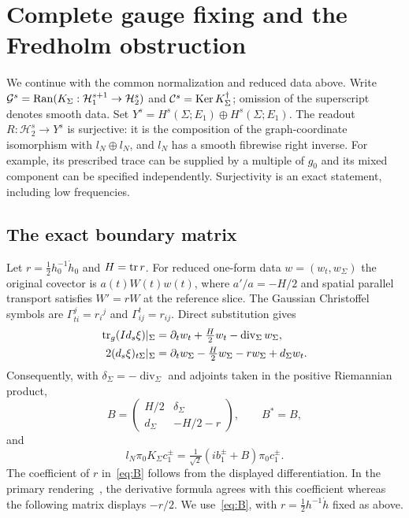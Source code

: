 \section{Complete gauge fixing and the Fredholm obstruction}\label{sec:fredholm}
We continue with the common normalization and reduced data above.
Write $\mathcal G^s=\operatorname{Ran}(K_\Sigma:\mathcal H_1^{s+1}\to\mathcal H_2^s)$ and $\mathcal C^s=\operatorname{Ker} K_\Sigma^\dagger$; omission of the superscript denotes smooth data.
Set $Y^s=H^s(\Sigma;E_1)\oplus H^s(\Sigma;E_1)$.
The readout $R:\mathcal H_2^s\to Y^s$ is surjective: it is the composition of the graph-coordinate isomorphism with $l_N\oplus l_N$, and $l_N$ has a smooth fibrewise right inverse.
For example, its prescribed trace can be supplied by a multiple of $g_0$ and its mixed component can be specified independently.
Surjectivity is an exact statement, including low frequencies.

\subsection{The exact boundary matrix}
Let $r=\tfrac12h_0^{-1}\dot h_0$ and $H=\operatorname{tr} r$.
For reduced one-form data $w=(w_t,w_\Sigma)$ the original covector is $a(t)W(t)w(t)$, where $a'/a=-H/2$ and spatial parallel transport satisfies $W'=rW$ at the reference slice.
The Gaussian Christoffel symbols are $\Gamma^j_{ti}=r_i{}^j$ and $\Gamma^t_{ij}=r_{ij}$.
Direct substitution gives
\begin{align*}
\operatorname{tr}_g(I d_s\xi)|_\Sigma
 &=\partial_t w_t+\tfrac H2w_t-\operatorname{div}_\Sigma w_\Sigma,\\
2(d_s\xi)_{t\Sigma}|_\Sigma
 &=\partial_t w_\Sigma-\tfrac H2w_\Sigma-rw_\Sigma+d_\Sigma w_t.
\end{align*}
Consequently, with $\delta_\Sigma=-\operatorname{div}_\Sigma$ and adjoints taken in the positive Riemannian product,
\begin{equation}\label{eq:B}
B=\begin{pmatrix}H/2&\delta_\Sigma\\d_\Sigma&-H/2-r\end{pmatrix},\qquad B^*=B,
\end{equation}
and
\begin{equation}\label{eq:readoutK}
l_N\pi_0K_\Sigma c_1^\pm
=\tfrac1{\sqrt2}(i b_1^\pm+B)\pi_0c_1^\pm.
\end{equation}
The coefficient of $r$ in~\eqref{eq:B} follows from the displayed differentiation.
In the primary rendering~\cite[Equations (4.10)--(4.11)]{Gerard2024Compact}, the derivative formula agrees with this coefficient whereas the following matrix displays $-r/2$.
We use~\eqref{eq:B}, with $r=\tfrac12h^{-1}\dot h$ fixed as above.

